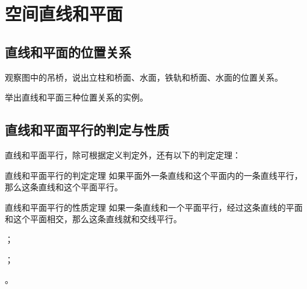 \section{空间直线和平面}
\subsection{直线和平面的位置关系}
\begin{Practice}
  \begin{question}
    \item 观察图中的吊桥，说出立柱和桥面、水面，铁轨和桥面、水面的位置关系。
    \item 举出直线和平面三种位置关系的实例。
  \end{question}
\end{Practice}
\subsection{直线和平面平行的判定与性质}
直线和平面平行，除可根据定义判定外，还有以下的判定定理：
\begin{Theorem}{直线和平面平行的判定定理}
  如果平面外一条直线和这个平面内的一条直线平行，那么这条直线和这个平面平行。
\end{Theorem}

\begin{Theorem}{直线和平面平行的性质定理}
  如果一条直线和一个平面平行，经过这条直线的平面和这个平面相交，那么这条直线就和交线平行。
\end{Theorem}
\begin{Practice}
  \begin{question}
    \item ；
    \item ；
    \item 。
  \end{question}
\end{Practice}
\begin{Exercise}
  \begin{question}
    \item 
    \item 
    \item 
    \item 
    \item 
    \item 
    \item 
    \item 
    \item 
    \item 
  \end{question}
\end{Exercise}
